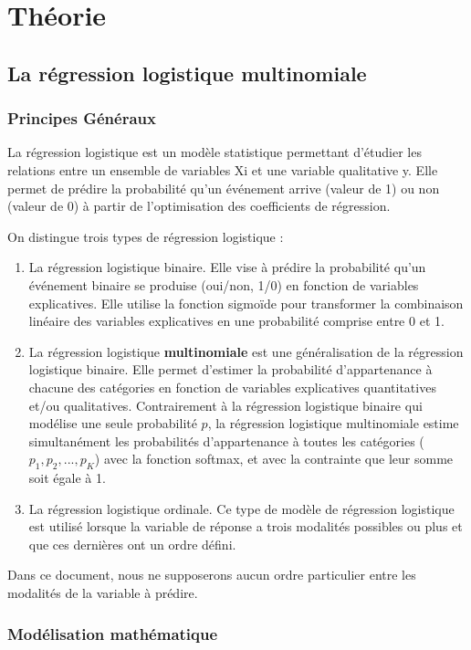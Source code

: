 \documentclass[10pt,french]{report}
\begin{document}
	\chapter{Théorie}

	\section{La régression logistique multinomiale}
	\subsection{Principes Généraux}
	La régression logistique est un modèle statistique permettant d'étudier les relations entre un ensemble de variables Xi et une variable qualitative y. Elle permet de prédire la probabilité qu'un événement arrive (valeur de 1) ou non (valeur de 0) à partir de l'optimisation des coefficients de régression.

	On distingue trois types de régression logistique :
	\begin{enumerate}
		\item La régression logistique binaire. Elle vise à prédire la probabilité qu'un événement binaire se produise (oui/non, 1/0) en fonction de variables explicatives. Elle utilise la fonction sigmoïde pour transformer la combinaison linéaire des variables explicatives en une probabilité comprise entre 0 et 1.
		\item La régression logistique \textbf{multinomiale} est une généralisation de la régression logistique binaire. Elle permet d'estimer la probabilité d'appartenance à chacune des catégories en fonction de variables explicatives quantitatives et/ou qualitatives. Contrairement à la régression logistique binaire qui modélise une seule probabilité $p$, la régression logistique multinomiale estime simultanément les probabilités d'appartenance à toutes les catégories ($p_1, p_2, ..., p_K$) avec la fonction softmax, et avec la contrainte que leur somme soit égale à 1.
		\item La régression logistique ordinale. Ce type de modèle de régression logistique est utilisé lorsque la variable de réponse a trois modalités possibles ou plus et que ces dernières ont un ordre défini.
	\end{enumerate}

	Dans ce document, nous ne supposerons aucun ordre particulier entre les modalités de la variable à prédire.

    \subsection{Modélisation mathématique\cite{makisreglog}}
\end{document}
